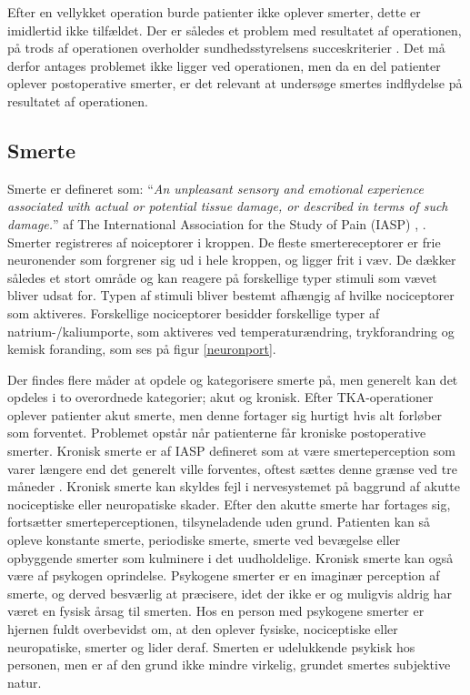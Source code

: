 Efter en vellykket operation burde patienter ikke oplever smerter, dette er imidlertid ikke tilfældet. Der er således et problem med resultatet af operationen, på trods af operationen overholder sundhedsstyrelsens succeskriterier \citep{aarsrapport2016}. Det må derfor antages problemet ikke ligger ved operationen, men da en del patienter oplever postoperative smerter, er det relevant at undersøge smertes indflydelse på resultatet af operationen. 

\subsection{Smerte}

Smerte er defineret som: “\textit{An unpleasant sensory and emotional experience associated with actual or potential tissue damage, or described in terms of such damage.}” af The International Association for the Study of Pain (IASP) \citep{Giangregorio1997}, \citep{Carmon}.\\
Smerter registreres af noiceptorer i kroppen. De fleste smertereceptorer er frie neuronender som forgrener sig ud i hele kroppen, og ligger frit i væv. De dækker således et stort område og kan reagere på forskellige typer stimuli som vævet bliver udsat for. Typen af stimuli bliver bestemt afhængig af hvilke nociceptorer som aktiveres. Forskellige nociceptorer besidder forskellige typer af natrium-/kaliumporte, som aktiveres ved temperaturændring, trykforandring og kemisk foranding, som ses på figur \ref{neuronport}.

Der findes flere måder at opdele og kategorisere smerte på, men generelt kan det opdeles i to overordnede kategorier; akut og kronisk. Efter TKA-operationer oplever patienter akut smerte, men denne fortager sig hurtigt hvis alt forløber som forventet. Problemet opstår når patienterne får kroniske postoperative smerter. Kronisk smerte er af IASP defineret som at være smerteperception som varer længere end det generelt ville forventes, oftest sættes denne grænse ved tre måneder \citep{Carmon}. Kronisk smerte kan skyldes fejl i nervesystemet på baggrund af akutte nociceptiske eller neuropatiske skader. Efter den akutte smerte har fortages sig, fortsætter smerteperceptionen, tilsyneladende uden grund. Patienten kan så opleve konstante smerte, periodiske smerte, smerte ved bevægelse eller opbyggende smerter som kulminere i det uudholdelige. Kronisk smerte kan også være af psykogen oprindelse. Psykogene smerter er en imaginær perception af smerte, og derved besværlig at præcisere, idet der ikke er og muligvis aldrig har været en fysisk årsag til smerten. Hos en person med psykogene smerter er hjernen fuldt overbevidst om, at den oplever fysiske, nociceptiske eller neuropatiske, smerter og lider deraf. Smerten er udelukkende psykisk hos personen, men er af den grund ikke mindre virkelig, grundet smertes subjektive natur. \citep{Giangregorio1997}

